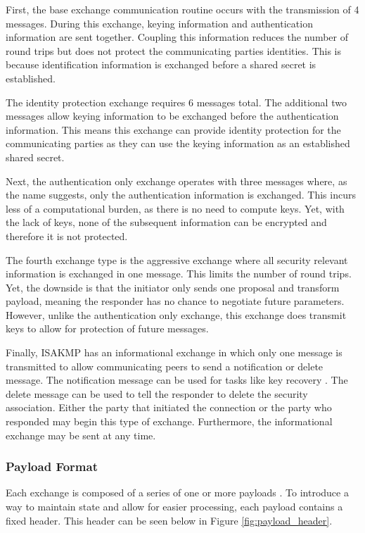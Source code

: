 \documentclass[12pt, letterpaper, twoside]{article}
\begin{document}
First, the base exchange communication routine occurs with the transmission of 4 messages. During this exchange, keying information and authentication information are sent together. Coupling this information reduces the number of round trips but does not protect the communicating parties identities. This is because identification information is exchanged before a shared secret is established. 

The identity protection exchange requires 6 messages total. The additional two messages allow keying information to be exchanged before the authentication information. This means this exchange can provide identity protection for the communicating parties as they can use the keying information as an established shared secret.

Next, the authentication only exchange operates with three messages where, as the name suggests, only the authentication information is exchanged.  This incurs less of a computational burden, as there is no need to compute keys. Yet, with the lack of keys, none of the subsequent information can be encrypted and therefore it is not protected.

The fourth exchange type is the aggressive exchange where all security relevant information is exchanged in one message. This limits the number of round trips. Yet, the downside is that the initiator only sends one proposal and transform payload, meaning the responder has no chance to negotiate future parameters. However, unlike the authentication only exchange, this exchange does transmit keys to allow for protection of future messages.

Finally, ISAKMP has an informational exchange in which only one message is transmitted to allow communicating peers to send a notification or delete message. The notification message can be used for tasks like key recovery \cite{recovery}. The delete message can be used to tell the responder to delete the security association. Either the party that initiated the connection or the party who responded may begin this type of exchange. Furthermore, the informational exchange may be sent at any time. 

\subsubsection{Payload Format}

Each exchange is composed of a series of one or more payloads \cite{ISAKMP}. To introduce a way to maintain state and allow for easier processing, each payload contains a fixed header. This header can be seen below in Figure \ref{fig:payload_header}. 
\end{document}
